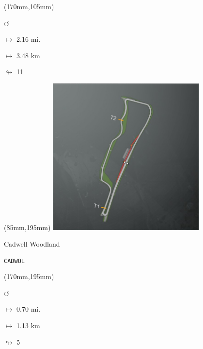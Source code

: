 \begin{textblock*}{30mm}(170mm,105mm)%
\par \Huge$\circlearrowleft$
\Large
\par$\mapsto$ 2.16 mi.
\par$\mapsto$ 3.48 km
\par$\looparrowright$ 11
\end{textblock*}
\begin{textblock*}{80mm}(85mm,195mm)%
\includegraphics[width=80mm]{TR/2015-05-20_00012.png}
\centerline{Cadwell Woodland}
\par\hfill\tiny\tt CADWOL\\
\end{textblock*}
\begin{textblock*}{30mm}(170mm,195mm)%
\par \Huge$\circlearrowleft$
\Large
\par$\mapsto$ 0.70 mi.
\par$\mapsto$ 1.13 km
\par$\looparrowright$ 5
\end{textblock*}
\null\newpage

